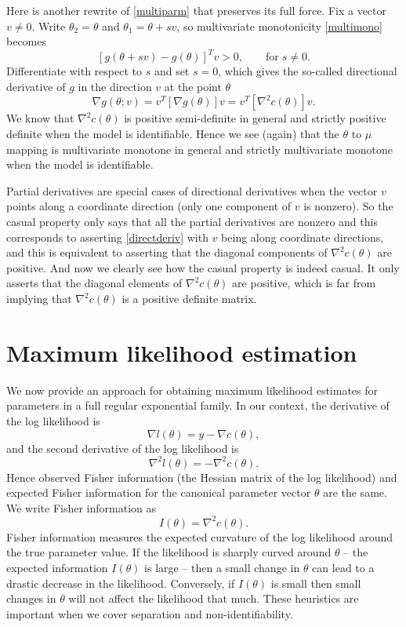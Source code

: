 \documentclass[
]{article}
\begin{document}
Here is another rewrite of \eqref{multiparm} that preserves its full
force. Fix a vector \(v \neq 0\). Write \(\theta_2 = \theta\) and
\(\theta_1 = \theta + sv\), so multivariate monotonicity
\eqref{multimono} becomes \[
  \left[g(\theta + sv) - g(\theta)\right]^Tv > 0, \qquad \text{for} \; s \neq 0.
\] Differentiate with respect to \(s\) and set \(s = 0\), which gives
the so-called directional derivative of \(g\) in the direction \(v\) at
the point \(\theta\) \begin{equation} \label{directderiv}
  \nabla g(\theta; v) = v^T\left[\nabla g(\theta)\right]v = v^T\left[\nabla^2 c(\theta)\right]v.
\end{equation} We know that \(\nabla^2 c(\theta)\) is positive
semi-definite in general and strictly positive definite when the model
is identifiable. Hence we see (again) that the \(\theta\) to \(\mu\)
mapping is multivariate monotone in general and strictly multivariate
monotone when the model is identifiable.

Partial derivatives are special cases of directional derivatives when
the vector \(v\) points along a coordinate direction (only one component
of \(v\) is nonzero). So the casual property only says that all the
partial derivatives are nonzero and this corresponds to asserting
\eqref{directderiv} with \(v\) being along coordinate directions, and
this is equivalent to asserting that the diagonal components of
\(\nabla^2 c(\theta)\) are positive. And now we clearly see how the
casual property is indeed casual. It only asserts that the diagonal
elements of \(\nabla^2 c(\theta)\) are positive, which is far from
implying that \(\nabla^2 c(\theta)\) is a positive definite matrix.

\hypertarget{maximum-likelihood-estimation}{%
\section{Maximum likelihood
estimation}\label{maximum-likelihood-estimation}}

We now provide an approach for obtaining maximum likelihood estimates
for parameters in a full regular exponential family. In our context, the
derivative of the log likelihood is \[
  \nabla l(\theta) = y - \nabla c(\theta),
\] and the second derivative of the log likelihood is \[
  \nabla^2 l(\theta) = -\nabla^2 c(\theta).
\] Hence observed Fisher information (the Hessian matrix of the log
likelihood) and expected Fisher information for the canonical parameter
vector \(\theta\) are the same. We write Fisher information as
\begin{equation} \label{FI}
    I(\theta) = \nabla^2 c(\theta).
\end{equation} Fisher information measures the expected curvature of the
log likelihood around the true parameter value. If the likelihood is
sharply curved around \(\theta\) -- the expected information
\(I(\theta)\) is large -- then a small change in \(\theta\) can lead to
a drastic decrease in the likelihood. Conversely, if \(I(\theta)\) is
small then small changes in \(\theta\) will not affect the likelihood
that much. These heuristics are important when we cover separation and
non-identifiability.
\end{document}
